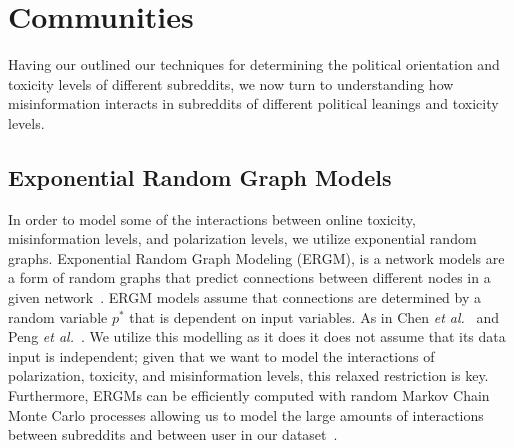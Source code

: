 \section{Communities}
Having our outlined our techniques for determining the political orientation and toxicity levels of different subreddits, we now turn to understanding how misinformation interacts in subreddits of different political leanings and toxicity levels. 



\subsection{Exponential Random Graph Models}
In order to model some of the interactions between online toxicity, misinformation levels, and polarization levels, we utilize exponential random graphs. Exponential Random Graph Modeling (ERGM), is a network models are a form of random graphs that predict connections between different nodes in a given network~\cite{hunter2008ergm}. ERGM models assume that connections are determined by a random variable $p^*$ that is dependent on input variables.  As in Chen \textit{et al.}~\cite{chen2022misleading} and Peng \textit{et al.}~\cite{peng2016follower}. We utilize this modelling as it does it does not assume that its data input is independent; given that we want to model the interactions of polarization, toxicity, and misinformation levels, this relaxed restriction is key. Furthermore, ERGMs can be efficiently computed with random Markov Chain Monte Carlo processes allowing us to model the large amounts of interactions between subreddits and between user in our dataset~\cite{van2019introduction,hunter2008ergm}.